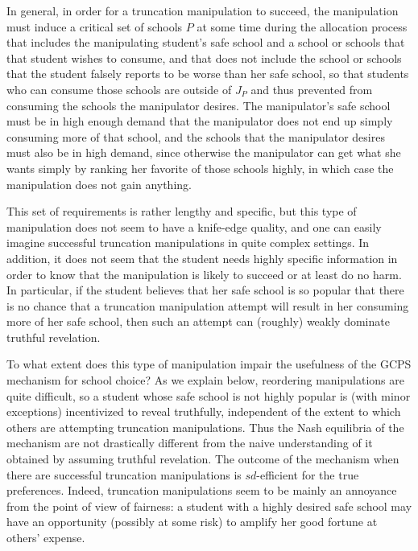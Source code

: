 \documentclass[12pt, A4paper]{article}
\theoremstyle{definition}
\begin{document}
In general, in order for a truncation manipulation to succeed, the manipulation must induce a critical set of schools $P$ at some time during the allocation process that includes the manipulating student's safe school and a school or schools that that student wishes to consume, and that does not include the school or schools that the student falsely reports to be worse than her safe school, so that students who can consume those schools are outside of $J_P$ and thus prevented from consuming the schools the manipulator desires.  The manipulator's safe school must be in high enough demand that the manipulator does not end up simply consuming more of that school, and the schools that the manipulator desires must also be in high demand, since otherwise the manipulator can get what she wants simply by ranking her favorite of those schools highly, in which case the manipulation does not gain anything.  

This set of requirements is rather lengthy and specific, but this type of manipulation does not seem to have a knife-edge quality, and one can easily imagine successful truncation manipulations in quite complex settings.  In addition, it does not seem that the student needs highly specific information in order to know that the manipulation is likely to succeed or at least do no harm.  In particular, if the student believes that her safe school is so popular that there is no chance that a truncation manipulation attempt will result in her consuming more of her safe school, then such an attempt can (roughly) weakly dominate truthful revelation.

To what extent does this type of manipulation impair the usefulness of the GCPS mechanism for school choice?  As we explain below, reordering manipulations are quite difficult, so a student whose safe school is not highly popular is (with minor exceptions) incentivized to reveal truthfully, independent of the extent to which others are attempting truncation manipulations.  Thus the Nash equilibria of the mechanism are not drastically different from the naive understanding of it obtained by assuming truthful revelation.  The outcome of the mechanism when there are successful truncation manipulations is $sd$-efficient for the true preferences.  Indeed, truncation manipulations seem to be mainly an annoyance from the point of view of fairness: a student with a highly desired safe school may have an opportunity (possibly at some risk) to amplify her good fortune at others' expense.
\end{document}
